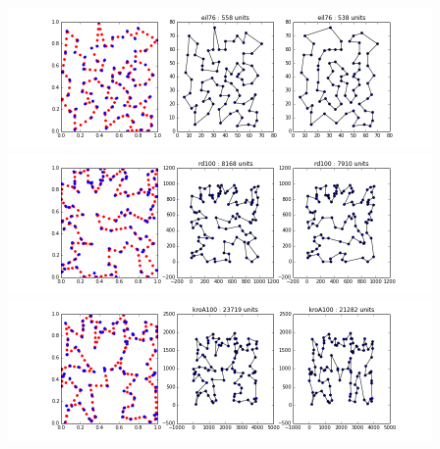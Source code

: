 \documentclass{article} %
\begin{document}
\begin{figure}[!htb]
\begin{center}
\includegraphics[scale=0.45]{figs/eil76}
\includegraphics[scale=0.45]{figs/rd100}
\includegraphics[scale=0.45]{figs/kroA100}

 \end{center}
\end{figure}
\end{document}
